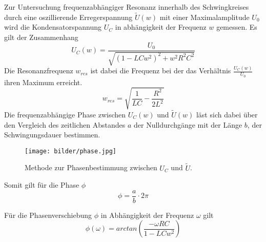 Zur Untersuchung frequenzabhängiger Resonanz innerhalb des Schwingkreises durch
eine oszillierende Erregerspannung $\tilde{U}(w)$ mit einer Maximalamplitude $U_0$
wird die Kondensatorspannung $U_C$ in abhängigkeit der Frequenz $w$ gemessen.
Es gilt der Zusammenhang
\begin{equation}
    U_C(w)=\frac{U_0}{\sqrt{(1-LCw^2)^2+w^2R^2C^2}}
\end{equation}
Die Resonanzfrequenz $w_{res}$ ist dabei die Frequenz bei der das Verhältnis 
$\frac{U_C(w)}{U_0}$ ihren Maximum erreicht.
\begin{equation}
    w_{res}=\sqrt{\frac{1}{LC}-\frac{R^2}{2L^2}}
\end{equation}
\newpage
Die frequenzabhängige Phase zwischen $U_C(w)$ und $\tilde{U}(w)$ läst sich
dabei über den Vergleich des zeitlichen Abstandes $a$ der Nulldurchgänge 
mit der Länge $b$, der Schwingungsdauer bestimmen.
\begin{figure}[H]
    \centering
    \texttt{[image: bilder/phase.jpg]}
    \caption{Methode zur Phasenbestimmung zwischen $U_C$ und $\tilde{U}$.\cite[282]{Anleitung2}}
    \label{eqn:phase}
\end{figure}
Somit gilt für die Phase $\phi$
\begin{equation}
    \phi = \frac{a}{b}\cdot 2\pi
\end{equation}

Für die Phasenverschiebung $\phi$ in Abhängigkeit der Frequenz $\omega$ gilt
\begin{equation}
    \phi(\omega)=arctan(\frac{- \omega R C}{1-LCw^2})
\end{equation}


\label{sec:theorie}